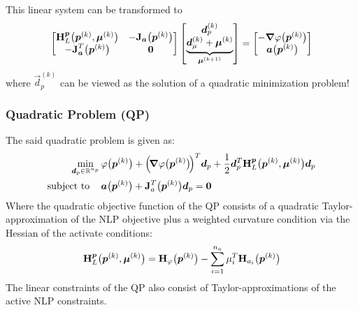 			This linear system can be transformed to
			\begin{align*}
				\begin{bmatrix}
					\bm{\mathrm{H}}_L^{\bm{p}}\big(\bm{p}^{(k)}, \bm{\mu}^{(k)}\big) & -\bm{\mathrm{J}}_{\bm{a}}\big(\bm{p}^{(k)}\big) \\
					-\bm{\mathrm{J}}_{\bm{a}}^T\big(\bm{p}^{(k)}\big)                 & \bm{\mathrm{0}}
				\end{bmatrix}
				\begin{bmatrix}
					\bm{d}_p^{(k)} \\
					\underbrace{\bm{d}_\mu^{(k)} + \bm{\mu}^{(k)}}_{\bm{\mu}^{(k + 1)}}
				\end{bmatrix}
				=
				\begin{bmatrix}
					-\grad{\varphi}\big(\bm{p}^{(k)}\big) \\
					\bm{a}\big(\bm{p}^{(k)}\big)
				\end{bmatrix}
			\end{align*}
			where \( \vec{d}_p^{(k)} \) can be viewed as the solution of a quadratic minimization problem!

			\subsubsection{Quadratic Problem (QP)}
				The said quadratic problem is given as:
				\begin{align*}
					\min_{\bm{d}_p \in \mathbb{R}^{n_p}} & \, \varphi\big(\bm{p}^{(k)}\big) + \Big(\!\grad{\varphi}\big(\bm{p}^{(k)}\big)\!\Big)^T \bm{d}_p + \frac{1}{2} \bm{d}_p^T \bm{\mathrm{H}}_L^{\bm{p}}\big(\bm{p}^{(k)}, \bm{\mu}^{(k)}\big) \bm{d}_p \\
					\mathrm{subject~to}\quad      & \, \bm{a}\big(\bm{p}^{(k)}\big) + \bm{\mathrm{J}}_a^T\big(\bm{p}^{(k)}\big) \bm{d}_p = \bm{0}
				\end{align*}
				Where the quadratic objective function of the QP consists of a quadratic Taylor-approximation of the NLP objective plus a weighted curvature condition via the Hessian of the activate conditions:
				\begin{align*}
					\bm{\mathrm{H}}_L^{\bm{p}}\big(\bm{p}^{(k)}, \bm{\mu}^{(k)}\big) = \bm{\mathrm{H}}_\varphi\big(\bm{p}^{(k)}\big) - \sum_{i = 1}^{n_a} \mu_i^T \bm{\mathrm{H}}_{a_i}\big(\bm{p}^{(k)}\big)
				\end{align*}
				The linear constraints of the QP also consist of Taylor-approximations of the active NLP constraints.


